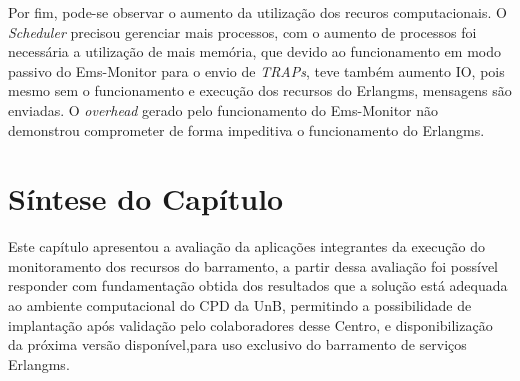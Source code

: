 Por fim, pode-se observar o aumento da utilização dos recuros computacionais. O \textit{Scheduler} precisou gerenciar mais processos, com o aumento de processos foi necessária a utilização de mais memória, que devido ao funcionamento em modo passivo do Ems-Monitor para o envio de \textit{TRAPs}, teve também aumento IO, pois mesmo sem o funcionamento e execução dos recursos do Erlangms, mensagens são enviadas. O \textit{overhead} gerado pelo funcionamento do Ems-Monitor não demonstrou comprometer de forma impeditiva o funcionamento do Erlangms.    
 

\section{Síntese do Capítulo}
\label{sintese5}

Este capítulo apresentou a avaliação da aplicações integrantes da execução do monitoramento dos recursos do barramento, a partir dessa avaliação foi possível responder com fundamentação obtida dos resultados que a solução está adequada ao ambiente computacional do \acrshort{CPD} da \acrshort{UnB}, permitindo a possibilidade de implantação após validação pelo colaboradores desse Centro, e disponibilização da próxima versão disponível,para uso exclusivo do barramento de serviços Erlangms.
